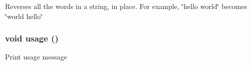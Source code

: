 Reverses all the words in a string, in place. For example, \char`\"{}hello world\char`\"{} becomes \char`\"{}world hello\char`\"{} 
\subsubsection{\setlength{\rightskip}{0pt plus 5cm}void usage ()}\label{reverse_8c_2ef30c42cbc289d899a8be5d2d8f77d0}


Print usage message 